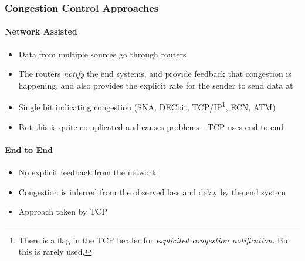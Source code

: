 \subsubsection{Congestion Control Approaches}
\paragraph{Network Assisted}
\begin{itemize}
	\item Data from multiple sources go through routers
	\item The routers \textit{notify} the end systems, and provide feedback that congestion is happening, and also provides the explicit rate for the sender to send data at
	\item Single bit indicating congestion (SNA, DECbit, TCP/IP\footnote{There is a flag in the TCP header for \textit{explicited congestion notification}. But this is rarely used.}, ECN, ATM)
	\item But this is quite complicated and causes problems - TCP uses end-to-end
\end{itemize}

\paragraph{End to End}
\begin{itemize}
	\item No explicit feedback from the network 
	\item Congestion is inferred from the observed loss and delay by the end system
	\item Approach taken by TCP
\end{itemize}

